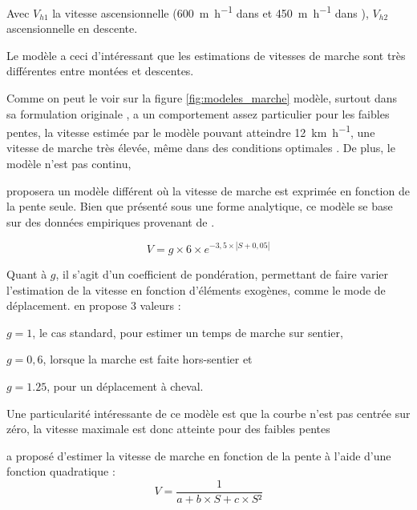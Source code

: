 Avec \(V_{h1}\) la vitesse ascensionnelle (\SI{600}{\meter\per\hour}
dans \textcite{Langmuir1984} et \SI{450}{\meter\per\hour} dans
\textcite{Langmuir2013}), \(V_{h2}\) ascensionnelle en descente.

Le modèle  a ceci d'intéressant que les
estimations de vitesses de marche sont très différentes entre montées
et descentes.

Comme on peut le voir sur la figure \ref{fig:modeles_marche} modèle,
surtout dans sa formulation originale \autocite{Langmuir1984}, a un
comportement assez particulier pour les faibles pentes, la vitesse
estimée par le modèle pouvant atteindre \SI{12}{\kilo\meter\per\hour},
une vitesse de marche très élevée, même dans des conditions optimales
\autocite{Kerouanton2020}. De plus, le modèle n'est pas continu, 



\textcite{Tobler1993} proposera un modèle différent où la vitesse de
marche est exprimée en fonction de la pente seule. Bien que présenté
sous une forme analytique, ce modèle se base sur des données
empiriques provenant de \textcite{Imhof1950} \autocite{Tobler1993}.

\begin{equation}
  \label{eq:marche_tobler}
  V = g × 6 × e^{-3,5 × \left| S + 0,05 \right|}
\end{equation}

Quant à \(g\), il s'agit d'un coefficient de
pondération, permettant de faire varier l'estimation de la vitesse en
fonction d'éléments exogènes, comme le mode de
déplacement. \textcite{Tobler1993} en propose 3 valeurs :
%
\begin{enumerate*}[label=(\alph*)]
\item \(g = 1\), le cas standard, pour estimer un temps de marche sur
  sentier,
\item \(g = 0,6\), lorsque la marche est faite hors-sentier et
\item  \(g = 1.25\), pour un déplacement à cheval.
\end{enumerate*}
%

Une particularité intéressante de ce modèle est que la courbe n'est
pas centrée sur zéro, la vitesse maximale est donc atteinte pour des
faibles pentes

\textcite{Rees2004} a proposé d'estimer la vitesse de marche en
fonction de la pente à l'aide d'une fonction quadratique :
\begin{equation}
  V = \dfrac{1}{a + b × S + c × S²}
\end{equation}

